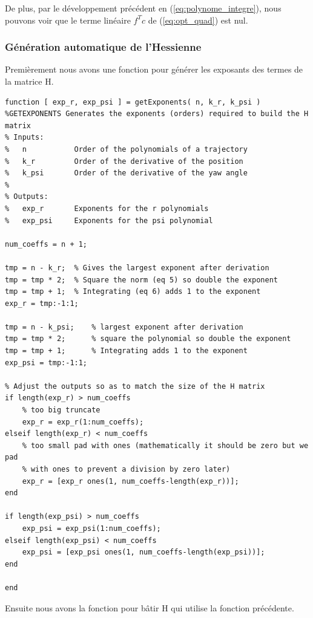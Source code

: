 \documentclass{article}
\begin{document}
De plus, par le développement précédent en (\ref{eq:polynome_integre}), nous pouvons voir que le terme linéaire $f^Tc$ de (\ref{eq:opt_quad}) est nul.

\subsubsection{Génération automatique de l'Hessienne}

Premièrement nous avons une fonction pour générer les exposants des termes de la matrice H.

\begin{lstlisting}[style=Matlab-editor]
function [ exp_r, exp_psi ] = getExponents( n, k_r, k_psi )
%GETEXPONENTS Generates the exponents (orders) required to build the H matrix
% Inputs:
%   n           Order of the polynomials of a trajectory
%   k_r         Order of the derivative of the position
%   k_psi       Order of the derivative of the yaw angle
%
% Outputs:
%   exp_r       Exponents for the r polynomials
%   exp_psi     Exponents for the psi polynomial

num_coeffs = n + 1;

tmp = n - k_r;  % Gives the largest exponent after derivation
tmp = tmp * 2;  % Square the norm (eq 5) so double the exponent
tmp = tmp + 1;  % Integrating (eq 6) adds 1 to the exponent
exp_r = tmp:-1:1;

tmp = n - k_psi;    % largest exponent after derivation
tmp = tmp * 2;      % square the polynomial so double the exponent
tmp = tmp + 1;      % Integrating adds 1 to the exponent
exp_psi = tmp:-1:1;

% Adjust the outputs so as to match the size of the H matrix
if length(exp_r) > num_coeffs
    % too big truncate
    exp_r = exp_r(1:num_coeffs);
elseif length(exp_r) < num_coeffs
    % too small pad with ones (mathematically it should be zero but we pad
    % with ones to prevent a division by zero later)
    exp_r = [exp_r ones(1, num_coeffs-length(exp_r))];
end

if length(exp_psi) > num_coeffs
    exp_psi = exp_psi(1:num_coeffs);
elseif length(exp_psi) < num_coeffs
    exp_psi = [exp_psi ones(1, num_coeffs-length(exp_psi))];
end

end
\end{lstlisting}

Ensuite nous avons la fonction pour bâtir H qui utilise la fonction précédente.
\end{document}
